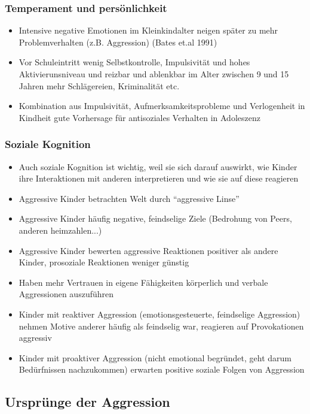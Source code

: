 \subsubsection{Temperament und persönlichkeit}
\begin{itemize}
	\item
		Intensive negative Emotionen im Kleinkindalter neigen später zu mehr Problemverhalten (z.B. Aggression) (Bates et.al 1991)
	\item
		Vor Schuleintritt wenig Selbstkontrolle, Impulsivität und hohes Aktivierunsniveau und reizbar und ablenkbar im Alter zwischen 9 und 15 Jahren mehr Schlägereien, Kriminalität etc.
	\item
		Kombination aus Impulsivität, Aufmerksamkeitsprobleme und Verlogenheit in Kindheit gute Vorhersage für antisoziales Verhalten  in Adoleszenz
\end{itemize}
\subsubsection{Soziale Kognition}
\begin{itemize}
	\item
		Auch soziale Kognition ist wichtig, weil sie sich darauf auswirkt, wie Kinder ihre Interaktionen mit anderen interpretieren und wie sie auf diese reagieren
	\item
		Aggressive Kinder betrachten Welt durch \enquote{aggressive Linse}
	\item
		Aggressive Kinder häufig negative, feindselige Ziele (Bedrohung von Peers, anderen heimzahlen...)
	\item
		Aggressive Kinder bewerten aggressive Reaktionen positiver als andere Kinder, prosoziale Reaktionen weniger günstig
	\item
		Haben mehr Vertrauen in eigene Fähigkeiten körperlich und verbale Aggressionen auszuführen
	\item
		Kinder mit reaktiver Aggression (emotionsgesteuerte, feindselige Aggression) nehmen Motive anderer häufig als feindselig war, reagieren auf Provokationen aggressiv
	\item
		Kinder mit proaktiver Aggression (nicht emotional begründet, geht darum Bedürfnissen nachzukommen) erwarten positive soziale Folgen von Aggression
\end{itemize}


\subsection{Ursprünge der Aggression}

